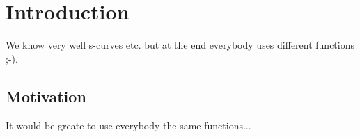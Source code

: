 \section{Introduction}\label{index_intro_sec}
We know very well s-curves etc. but at the end everybody uses different functions ;-).\subsection{Motivation}\label{index_mot_sec}
It would be greate to use everybody the same functions... 